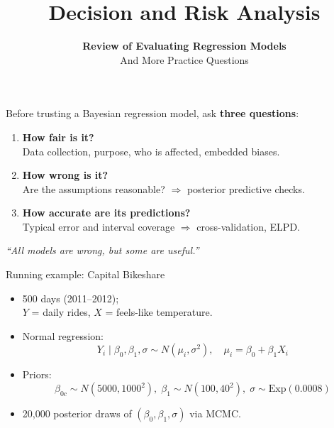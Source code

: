 \documentclass[aspectratio=43,11pt]{beamer}
\title{Decision and Risk Analysis}
\subtitle{\textbf{Review of Evaluating Regression Models}\\And More Practice Questions}
\author{}
\date{
\color{aggiemaroon}{
DAEN 427 / ISEN 427 / ISEN 627 - Fall 2026\\
\textbf{Alexander Abuabara}
}
}
\begin{document}
\begin{frame}
  \titlepage
\end{frame}

\begin{frame}{}
  Before trusting a Bayesian regression model, ask \textbf{three questions}:
  \vspace{0.6em}
  \begin{enumerate}
    \item \textbf{How fair is it?} \\
      Data collection, purpose, who is affected, embedded biases.
    \item \textbf{How wrong is it?} \\
      Are the assumptions reasonable? $\Rightarrow$ posterior predictive checks.
    \item \textbf{How accurate are its predictions?} \\
      Typical error and interval coverage $\Rightarrow$ cross-validation, ELPD.
  \end{enumerate}
  \vspace{0.6em}
  \emph{``All models are wrong, but some are useful.''}
\end{frame}

\begin{frame}{Running example: Capital Bikeshare}
  \begin{itemize}
    \item 500 days (2011--2012);\\
          $Y$ = daily rides, $X$ = feels-like temperature.
    \item Normal regression:
    \[
      Y_i \mid \beta_0,\beta_1,\sigma \sim N(\mu_i,\sigma^2), \quad
      \mu_i = \beta_0 + \beta_1 X_i
    \]
    \item Priors:
    \[
      \beta_{0c} \sim N(5000,1000^2),\;
      \beta_1 \sim N(100,40^2),\;
      \sigma \sim \text{Exp}(0.0008)
    \]
    \item 20{,}000 posterior draws of $(\beta_0,\beta_1,\sigma)$ via MCMC.
  \end{itemize}
\end{frame}
\end{document}
